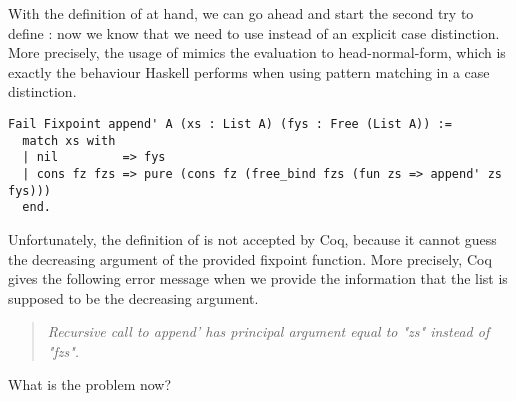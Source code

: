 With the definition of  at hand, we can go ahead and start the second try to define : now we know that we need to use  instead of an explicit case distinction.
More precisely, the usage of  mimics the evaluation to head-normal-form, which is exactly the behaviour Haskell performs when using pattern matching in a case distinction.

\begin{verbatim}
Fail Fixpoint append' A (xs : List A) (fys : Free (List A)) :=
  match xs with
  | nil         => fys
  | cons fz fzs => pure (cons fz (free_bind fzs (fun zs => append' zs fys)))
  end.
\end{verbatim}

Unfortunately, the definition of  is not accepted by Coq, because it cannot guess the decreasing argument of the provided fixpoint function.
More precisely, Coq gives the following error message when we provide the information that the list  is supposed to be the decreasing argument.

\begin{quote}
\emph{Recursive call to append' has principal argument equal to "zs" instead of "fzs".}
\end{quote}

What is the problem now?

